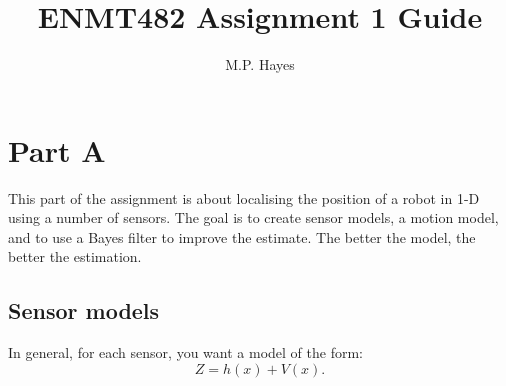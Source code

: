 \documentclass[a4paper, 12]{article}
\title{ENMT482 Assignment 1 Guide}
\author{M.P. Hayes}
\date{}
\begin{document}
\maketitle


\section{Part A}

This part of the assignment is about localising the position of a
robot in 1-D using a number of sensors.  The goal is to create sensor
models, a motion model, and to use a Bayes filter to improve the
estimate.  The better the model, the better the estimation.


\subsection{Sensor models}

In general, for each sensor, you want a model of the form:
%
\begin{equation}
  Z = h(x) + V(x).
\end{equation}
\end{document}
